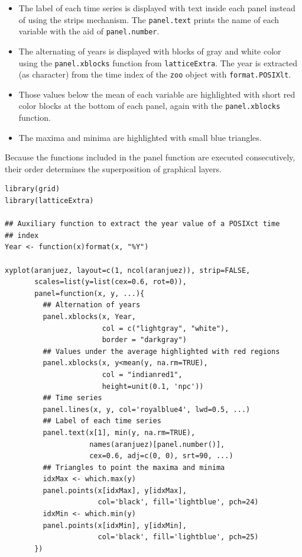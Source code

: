 \documentclass[smallroyalvopaper]{memoir}
\begin{document}
\begin{itemize}
\item The label of each time series is displayed with text inside each
panel instead of using the strips mechanism. The \texttt{panel.text}
prints the name of each variable with the aid of \texttt{panel.number}.
\item The alternating of years is displayed with blocks of gray and
white color using the \texttt{panel.xblocks} function from
\texttt{latticeExtra}. The year is extracted (as character) from the
time index of the \texttt{zoo} object with \texttt{format.POSIXlt}.
\item Those values below the mean of each variable are highlighted
with short red color blocks at the bottom of each panel, again
with the \texttt{panel.xblocks} function.
\item The maxima and minima are highlighted with small blue triangles.
\end{itemize}

Because the functions included in the panel function are executed
consecutively, their order determines the superposition of graphical
layers.

\lstset{language=R,numbers=none}
\begin{lstlisting}
library(grid)
library(latticeExtra)

## Auxiliary function to extract the year value of a POSIXct time
## index
Year <- function(x)format(x, "%Y")

xyplot(aranjuez, layout=c(1, ncol(aranjuez)), strip=FALSE,
       scales=list(y=list(cex=0.6, rot=0)),
       panel=function(x, y, ...){
         ## Alternation of years
         panel.xblocks(x, Year,
                       col = c("lightgray", "white"),
                       border = "darkgray")
         ## Values under the average highlighted with red regions
         panel.xblocks(x, y<mean(y, na.rm=TRUE),
                       col = "indianred1",
                       height=unit(0.1, 'npc'))
         ## Time series
         panel.lines(x, y, col='royalblue4', lwd=0.5, ...)
         ## Label of each time series
         panel.text(x[1], min(y, na.rm=TRUE),
                    names(aranjuez)[panel.number()],
                    cex=0.6, adj=c(0, 0), srt=90, ...)
         ## Triangles to point the maxima and minima 
         idxMax <- which.max(y)
         panel.points(x[idxMax], y[idxMax],
                      col='black', fill='lightblue', pch=24)
         idxMin <- which.min(y)
         panel.points(x[idxMin], y[idxMin],
                      col='black', fill='lightblue', pch=25)
       })
\end{lstlisting}
\end{document}
